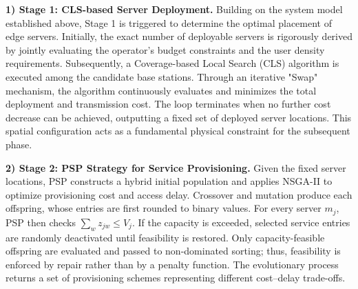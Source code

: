 \documentclass[10pt, conference, letterpaper]{IEEEtran}
\begin{document}
\textbf{1) Stage 1: CLS-based Server Deployment.} 
 Building on the system model established above, Stage 1 is triggered to determine the optimal placement of edge servers.
  Initially, the exact number of deployable servers is rigorously derived by jointly evaluating the operator's budget
  constraints and the user density requirements. Subsequently, a Coverage-based Local Search (CLS) algorithm is executed
  among the candidate base stations. Through an iterative "Swap" mechanism, the algorithm continuously evaluates and
  minimizes the total deployment and transmission cost. The loop terminates when no further cost decrease can be achieved,
  outputting a fixed set of deployed server locations. This spatial configuration acts as a fundamental physical constraint
  for the subsequent phase.


\textbf{2) Stage 2: PSP Strategy for Service Provisioning.}
Given the fixed server locations, PSP constructs a hybrid initial population and applies NSGA-II to optimize provisioning cost and access delay. Crossover and mutation produce each offspring, whose entries are first rounded to binary values. For every server $m_j$, PSP then checks $\sum_w z_{jw}\leq V_j$. If the capacity is exceeded, selected service entries are randomly deactivated until feasibility is restored. Only capacity-feasible offspring are evaluated and passed to non-dominated sorting; thus, feasibility is enforced by repair rather than by a penalty function. The evolutionary process returns a set of provisioning schemes representing different cost--delay trade-offs.

\end{document}
